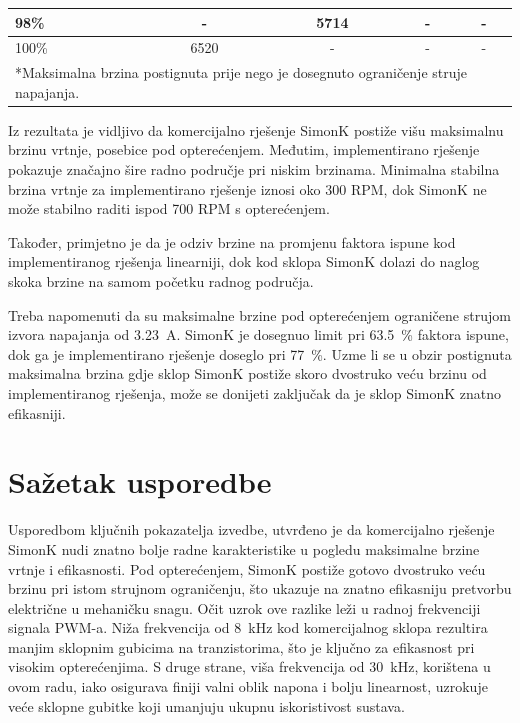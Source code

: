 \documentclass[diplomskirad]{fer}
\begin{document}
\begin{table}[h!]
\begin{tabular}{|l|c|c|c|c|}
		98\%                   & -                                           & \num{5714}                                               & -               & -                       \\ \hline
		100\%                  & \num{6520}                                  & -                                                        & -               & -                       \\ \hline
		\multicolumn{5}{l}{\footnotesize{*Maksimalna brzina postignuta prije nego je dosegnuto ograničenje struje napajanja.}}
	\end{tabular}
\end{table}

Iz rezultata je vidljivo da komercijalno rješenje SimonK postiže višu
maksimalnu brzinu vrtnje, posebice pod opterećenjem. Međutim, implementirano
rješenje pokazuje značajno šire radno područje pri niskim brzinama. Minimalna
stabilna brzina vrtnje za implementirano rješenje iznosi oko 300 RPM, dok
SimonK ne može stabilno raditi ispod 700 RPM s opterećenjem.

Također, primjetno je da je odziv brzine na promjenu faktora ispune kod
implementiranog rješenja linearniji, dok kod sklopa SimonK dolazi do naglog
skoka brzine na samom početku radnog područja.

Treba napomenuti da su maksimalne brzine pod opterećenjem ograničene strujom
izvora napajanja od \SI{3.23}{\ampere}. SimonK je dosegnuo limit pri
\SI{63.5}{\%} faktora ispune, dok ga je implementirano rješenje doseglo pri
\SI{77}{\%}. Uzme li se u obzir postignuta maksimalna brzina gdje sklop SimonK
postiže skoro dvostruko veću brzinu od implementiranog rješenja, može se
donijeti zaključak da je sklop SimonK znatno efikasniji.

\section{Sažetak usporedbe}

\label{sec:sazetak_usporedbe}

Usporedbom ključnih pokazatelja izvedbe, utvrđeno je da komercijalno rješenje
SimonK nudi znatno bolje radne karakteristike u pogledu maksimalne brzine
vrtnje i efikasnosti. Pod opterećenjem, SimonK postiže gotovo dvostruko veću
brzinu pri istom strujnom ograničenju, što ukazuje na znatno efikasniju
pretvorbu električne u mehaničku snagu. Očit uzrok ove razlike leži u radnoj
frekvenciji signala PWM-a. Niža frekvencija od \SI{8}{\kilo\hertz} kod
komercijalnog sklopa rezultira manjim sklopnim gubicima na tranzistorima, što
je ključno za efikasnost pri visokim opterećenjima. S druge strane, viša
frekvencija od \SI{30}{\kilo\hertz}, korištena u ovom radu, iako osigurava
finiji valni oblik napona i bolju linearnost, uzrokuje veće sklopne gubitke
koji umanjuju ukupnu iskoristivost sustava.
\end{document}

